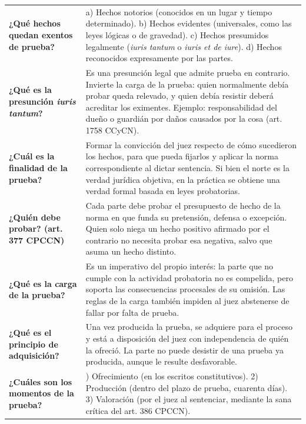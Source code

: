 \documentclass[12pt,oneside]{book}
\begin{document}
\begin{longtable}{
    >{\raggedright\arraybackslash}p{}
    >{\raggedright\arraybackslash}p{}
}
\textbf{¿Qué hechos quedan exentos de prueba?} &
a) Hechos notorios (conocidos en un lugar y tiempo determinado). b) Hechos evidentes (universales, como las leyes lógicas o de gravedad). c) Hechos presumidos legalmente (\textit{iuris tantum} o \textit{iuris et de iure}). d) Hechos reconocidos expresamente por las partes. \\

\textbf{¿Qué es la presunción \textit{iuris tantum}?} &
Es una presunción legal que admite prueba en contrario. Invierte la carga de la prueba: quien normalmente debía probar queda relevado, y quien debía resistir deberá acreditar los eximentes. Ejemplo: responsabilidad del dueño o guardián por daños causados por la cosa (art. 1758 CCyCN). \\

\textbf{¿Cuál es la finalidad de la prueba?} &
Formar la convicción del juez respecto de cómo sucedieron los hechos, para que pueda fijarlos y aplicar la norma correspondiente al dictar sentencia. Si bien el norte es la verdad jurídica objetiva, en la práctica se obtiene una verdad formal basada en leyes probatorias. \\

\textbf{¿Quién debe probar? (art. 377 CPCCN)} &
Cada parte debe probar el presupuesto de hecho de la norma en que funda su pretensión, defensa o excepción. Quien solo niega un hecho positivo afirmado por el contrario no necesita probar esa negativa, salvo que asuma un hecho distinto. \\

\textbf{¿Qué es la carga de la prueba?} &
Es un imperativo del propio interés: la parte que no cumple con la actividad probatoria no es compelida, pero soporta las consecuencias procesales de su omisión. Las reglas de la carga también impiden al juez abstenerse de fallar por falta de prueba. \\

\textbf{¿Qué es el principio de adquisición?} &
Una vez producida la prueba, se adquiere para el proceso y está a disposición del juez con independencia de quién la ofreció. La parte no puede desistir de una prueba ya producida, aunque le resulte desfavorable. \\

\textbf{¿Cuáles son los momentos de la prueba?} &
1) Ofrecimiento (en los escritos constitutivos). 2) Producción (dentro del plazo de prueba, cuarenta días). 3) Valoración (por el juez al sentenciar, mediante la sana crítica del art. 386 CPCCN). \\


\end{longtable}
\end{document}
